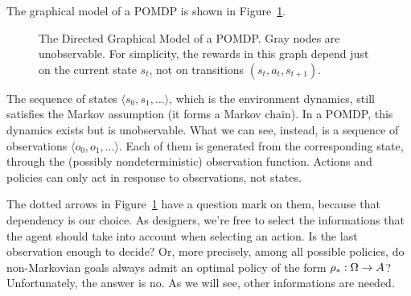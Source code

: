 The graphical model of a POMDP is shown in Figure~\ref{fig:pomdp}.
\begin{figure}

	\centering
	\caption{The Directed Graphical Model of a POMDP. Gray nodes are
	unobservable. For simplicity, the rewards in this graph depend just on the
	current state $s_t$, not on transitions ${(s_t, a_t, s_{t+1})}$.}
	\label{fig:pomdp}
\end{figure}
The sequence of states ${\langle s_0, s_1, \dots \rangle}$, which is the
environment dynamics, still satisfies the Markov assumption (it forms a Markov
chain). In a POMDP, this dynamics exists but is unobservable. What we can
see, instead, is a sequence of observations ${ \langle o_0, o_1, \dots
\rangle}$. Each of them is generated from the corresponding state, through the
(possibly nondeterministic) observation function. Actions and policies can
only act in response to observations, not states.

The dotted arrows in Figure~\ref{fig:pomdp} have a question mark on them,
because that dependency is our choice. As designers, we're free to select
the informations that the agent should take into account when selecting an
action. Is the last observation enough to decide? Or, more precisely, among
all possible policies, do non-Markovian goals always admit an optimal policy
of the form ${\rho}_*: \Omega \to A$? Unfortunately, the answer is no.
As we will see, other informations are needed.

